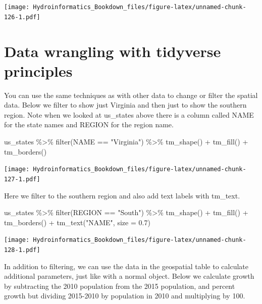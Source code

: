 \documentclass[
]{book}
\newenvironment{Shaded}{\begin{snugshade}}{\end{snugshade}}
\newcommand{\AttributeTok}[1]{\textcolor[rgb]{0.77,0.63,0.00}{#1}}
\newcommand{\FloatTok}[1]{\textcolor[rgb]{0.00,0.00,0.81}{#1}}
\newcommand{\FunctionTok}[1]{\textcolor[rgb]{0.00,0.00,0.00}{#1}}
\newcommand{\NormalTok}[1]{#1}
\newcommand{\SpecialCharTok}[1]{\textcolor[rgb]{0.00,0.00,0.00}{#1}}
\newcommand{\StringTok}[1]{\textcolor[rgb]{0.31,0.60,0.02}{#1}}
\begin{document}
\texttt{[image: Hydroinformatics\_Bookdown\_files/figure-latex/unnamed-chunk-126-1.pdf]}

\hypertarget{data-wrangling-with-tidyverse-principles}{%
\section{Data wrangling with tidyverse principles}\label{data-wrangling-with-tidyverse-principles}}

You can use the same techniques as with other data to change or filter the spatial data. Below we filter to show just Virginia and then just to show the southern region. Note when we looked at us\_states above there is a column called NAME for the state names and REGION for the region name.

\begin{Shaded}
\begin{Highlighting}[]
\NormalTok{us\_states }\SpecialCharTok{\%\textgreater{}\%} \FunctionTok{filter}\NormalTok{(NAME }\SpecialCharTok{==} \StringTok{"Virginia"}\NormalTok{) }\SpecialCharTok{\%\textgreater{}\%}
  \FunctionTok{tm\_shape}\NormalTok{() }\SpecialCharTok{+}
  \FunctionTok{tm\_fill}\NormalTok{() }\SpecialCharTok{+}
  \FunctionTok{tm\_borders}\NormalTok{() }
\end{Highlighting}
\end{Shaded}

\texttt{[image: Hydroinformatics\_Bookdown\_files/figure-latex/unnamed-chunk-127-1.pdf]}

Here we filter to the southern region and also add text labels with tm\_text.

\begin{Shaded}
\begin{Highlighting}[]
\NormalTok{us\_states }\SpecialCharTok{\%\textgreater{}\%} \FunctionTok{filter}\NormalTok{(REGION }\SpecialCharTok{==} \StringTok{"South"}\NormalTok{) }\SpecialCharTok{\%\textgreater{}\%}
  \FunctionTok{tm\_shape}\NormalTok{() }\SpecialCharTok{+}
  \FunctionTok{tm\_fill}\NormalTok{() }\SpecialCharTok{+}
  \FunctionTok{tm\_borders}\NormalTok{() }\SpecialCharTok{+}
  \FunctionTok{tm\_text}\NormalTok{(}\StringTok{"NAME"}\NormalTok{, }\AttributeTok{size =} \FloatTok{0.7}\NormalTok{)}
\end{Highlighting}
\end{Shaded}

\texttt{[image: Hydroinformatics\_Bookdown\_files/figure-latex/unnamed-chunk-128-1.pdf]}

In addition to filtering, we can use the data in the geospatial table to calculate additional parameters, just like with a normal object. Below we calculate growth by subtracting the 2010 population from the 2015 population, and percent growth but dividing 2015-2010 by population in 2010 and multiplying by 100.
\end{document}
